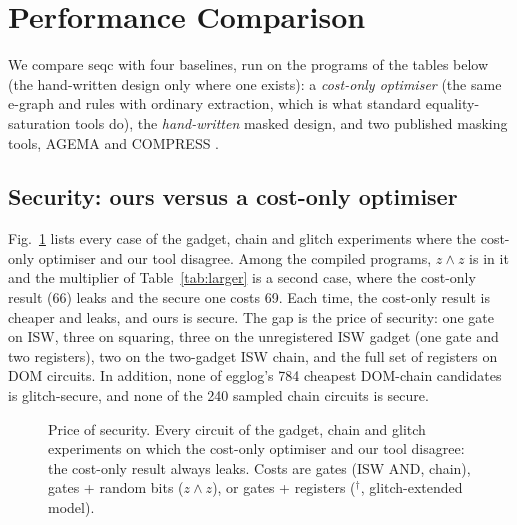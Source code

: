 \documentclass[conference]{IEEEtran}
\begin{document}
\section{Performance Comparison}\label{sec:perf}
We compare seqc with four baselines, run on the programs of the tables below (the hand-written design only where one exists): a \emph{cost-only optimiser} (the same e-graph and rules with ordinary extraction, which is what standard equality-saturation tools do), the \emph{hand-written} masked design, and two published masking tools, AGEMA \cite{knichel2021agema} and COMPRESS \cite{cassiers2024compress}.

\subsection{Security: ours versus a cost-only optimiser}
Fig.~\ref{fig:price} lists every case of the gadget, chain and glitch experiments where the cost-only optimiser and our tool disagree. Among the compiled programs, $z\wedge z$ is in it and the multiplier of Table~\ref{tab:larger} is a second case, where the cost-only result (66) leaks and the secure one costs 69. Each time, the cost-only result is cheaper and leaks, and ours is secure. The gap is the price of security: one gate on ISW, three on squaring, three on the unregistered ISW gadget (one gate and two registers), two on the two-gadget ISW chain, and the full set of registers on DOM circuits. In addition, none of egglog's 784 cheapest DOM-chain candidates is glitch-secure, and none of the 240 sampled chain circuits is secure.

\begin{figure}[t]
\centering
{}
\caption{Price of security. Every circuit of the gadget, chain and glitch experiments on which the cost-only optimiser and our tool disagree: the cost-only result always leaks. Costs are gates (ISW AND, chain), gates + random bits ($z\wedge z$), or gates + registers ($^\dagger$, glitch-extended model).}
\label{fig:price}
\end{figure}
\end{document}
